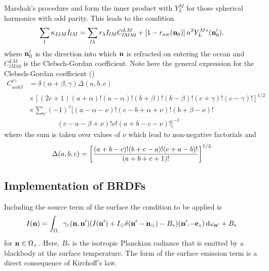 Marshak's procedure and form the inner product with $Y_L^M$ for those
spherical harmonics with odd parity. This leads to the condition
\begin{equation}
\sum_l \kappa_{LlM} I_{lM} = \sum_{l\lambda} r_\lambda I_{lM} C_{lM\lambda 0}
^{LM} + \left [ 1 - r_{aw}(\mathbf{n}_0) \right ] n^2 Y_L^{M*}(\mathbf{n}'_0).
\end{equation}
where $\mathbf{n}'_0$ is the direction into which $\mathbf{n}$ is refracted on entering the
ocean and $C_{lM\lambda 0}^{LM}$ is the Clebsch-Gordan coefficient. Note here
the general expression for the Clebsch-Gordan coefficient (\cite{Brink})
\begin{equation}
\begin{split}
C_{a\alpha b\beta}^{c\gamma} &= \delta(\alpha+\beta,\gamma) \Delta(a,b,c) \\
&\times \left [ (2c+1) (a+\alpha)!(a -\alpha)! (b+\beta)!(b-\beta)!
(c+\gamma)!(c-\gamma)! \right ] ^{1/2} \\
&\times \sum_\nu (-1)^\nu \big [ (a-\alpha-\nu)! (c-b+\alpha+\nu)! 
(b+\beta-\nu)! \\
&\qquad\qquad (c-a-\beta+\nu)! \nu! (a+b-c-\nu)! \big ]^{-1}
\end{split}
\end{equation}
where the sum is taken over values of $\nu$ which lead to non-negative 
factorials and
\begin{equation}
\Delta(a,b,c)=\left [ { {(a+b-c)!(b+c-a)!(c+a-b)!}\over{(a+b+c+1)!} } 
\right ]^{1/2}
\end{equation}

\subsection{Implementation of BRDFs}

Including the source term of the surface the condition to be applied is
\begin{equation}
I(\mathbf{n}) = \int_{\Omega_-} \gamma_r(\mathbf{n}, \mathbf{n}') (I(\mathbf{n}') +I_\odot \delta 
(\mathbf{n}'-{\mathbf{n}}_\odot) -B_*) 
(\mathbf{n}' . {-\mathbf{e}}_z) \, d \omega_{\mathbf{n}'} +B_*
\end{equation}
for $\mathbf{n}\in\Omega_+$. Here, $B_*$ is the isotropic Planckian radiance that is
emitted by a blackbody at the surface temperature. The form of the surface
emission term is a direct consequence of Kirchoff's law. 

